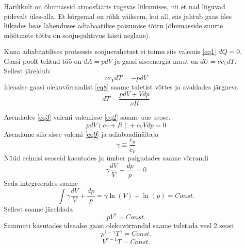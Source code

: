 \documentclass{trkut}%
\begin{document}
Harilikult on õhumassid atmosfääris tugevas liikumises, nii et nad liiguvad pidevalt üles-alla. Et kõrgemal on rõhk väiksem, kui all, siis jahtub gaas üles liikudes heas lähenduses adiabaatilise paisumise tõttu (õhumasside suurte mõõtmete tõttu on soojusjuhtivus hästi aeglane).



Kuna adiabaatilises protsessis soojusvahetust ei toimu siis valemis \ref{eq1} $dQ=0$. Gaasi poolt tehtud töö on $d A=pdV$ ja gaasi siseenergia muut on $dU=\nu c_VdT$. Sellest järeldub:
\begin{equation}\label{eq2}
\nu c_VdT = -pdV
\end{equation}
Ideaalse gaasi olekuvõrrandist \ref{eq8} saame tuletist võttes ja avaldades järgneva
\begin{equation}\label{eq3}
dT = \frac{pdV+Vdp}{\nu R}
\end{equation}

Asendades \ref{eq3} valemi valemisse \ref{eq2} saame uue seose.
\begin{equation}\label{eq4}
pdV(c_V+R)+c_VVdp=0
\end{equation}
Asendame siia sisse valemi \ref{eq9} ja adiabaadinäitaja
\begin{equation}
\gamma \equiv \frac{c_p}{c_V}
\end{equation}
Nüüd eelmisi seoseid kasutades ja ümber paigudades saame võrrandi
\begin{equation}
\gamma \frac{dV}{V} + \frac{dp}{p} = 0
\end{equation}
Seda integreerides saame
\begin{equation}
 \int \gamma \frac{dV}{V} + \frac{dp}{p} = \gamma \ln(V) + \ln(p) = Const.
\end{equation}
Sellest saame järeldada
\begin{equation}
pV^\gamma = Const.
\end{equation}
Sammuti kasutades ideaalse gaasi olekuvõrrandid saame tuletada veel 2 seost
\begin{equation}\label{eq13}
p^{1-\gamma}T^\gamma = Const.
\end{equation}
\begin{equation}
V^{\gamma-1}T = Const.
\end{equation}
\end{document}
